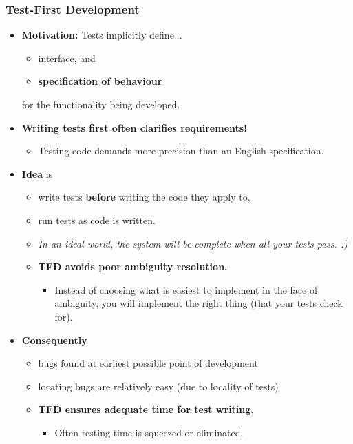 \documentclass[a4paper]{article}
\providecommand{\tightlist}{%
  \setlength{\itemsep}{0pt}\setlength{\parskip}{0pt}}
\begin{document}
\hypertarget{test-first-development}{%
\subsubsection{Test-First Development}\label{test-first-development}}

\begin{itemize}
\item
  \textbf{Motivation:} Tests implicitly define...

  \begin{itemize}
  \tightlist
  \item
    interface, and
  \item
    \textbf{specification of behaviour}
  \end{itemize}

  for the functionality being developed.
\item
  \textbf{Writing tests first often clarifies requirements!}

  \begin{itemize}
  \tightlist
  \item
    Testing code demands more precision than an English specification.
  \end{itemize}
\item
  \textbf{Idea} is

  \begin{itemize}
  \tightlist
  \item
    write tests \textbf{before} writing the code they apply to,
  \item
    run tests as code is written.
  \item
    \emph{In an ideal world, the system will be complete when all your
    tests pass. :)}
  \item
    \textbf{TFD avoids poor ambiguity resolution.}

    \begin{itemize}
    \tightlist
    \item
      Instead of choosing what is easiest to implement in the face of
      ambiguity, you will implement the right thing (that your tests
      check for).
    \end{itemize}
  \end{itemize}
\item
  \textbf{Consequently}

  \begin{itemize}
  \tightlist
  \item
    bugs found at earliest possible point of development
  \item
    locating bugs are relatively easy (due to locality of tests)
  \item
    \textbf{TFD ensures adequate time for test writing.}

    \begin{itemize}
    \tightlist
    \item
      Often testing time is squeezed or eliminated.
    \end{itemize}
  \end{itemize}
\end{itemize}
\end{document}
